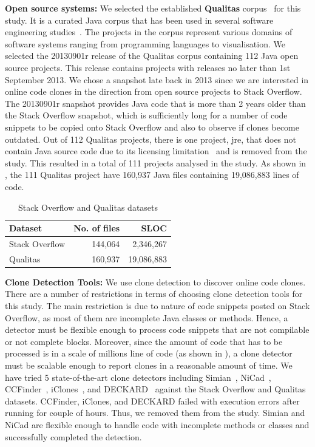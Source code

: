 \documentclass[sigconf,review, anonymous]{acmart}
\begin{document}
\textbf{Open source systems: }
We selected the established \textbf{Qualitas} corpus~\cite{QualitasCorpus} 
for this study. It is a curated Java corpus that has been used in several
software engineering
studies~\cite{Taube-Schock2011,Beckman2011,Vasilescu2011,Omar2012}. The
projects in the corpus represent various domains of software systems
ranging from programming languages to
visualisation. We selected the 20130901r release
of the Qualitas corpus containing 112 Java open source projects. This
release contains projects with releases no later than 1st September
2013. We chose a snapshot late back in 2013 since we are interested in
online code clones in the direction from open source projects to Stack
Overflow. The 20130901r snapshot provides Java code that is more than
2 years older than the Stack Overflow snapshot, which is sufficiently
long for a number of code snippets to be copied onto Stack Overflow
and also to observe if clones become outdated. Out of 112 Qualitas
projects, there is one project, \textsf{jre}, that does not contain
Java source code due to its licensing limitation~\cite{QualitasCorpus}
and is removed from the study. This resulted in a total of 111
projects analysed in the study. As shown in , the
111 Qualitas project have 160,937 Java files containing 19,086,883
lines of
code. %

\begin{table}
  \centering
  \caption{Stack Overflow and Qualitas datasets}
  \label{tab:datasets}
  \begin{tabular}{lrr}
    \hline 
    Dataset & No. of files & SLOC \\
    \hline
    Stack Overflow & 144,064 & 2,346,267 \\ 
    Qualitas &  160,937 & 19,086,883 \\ 
    \hline 
  \end{tabular} 
\end{table}

\textbf{Clone Detection Tools: }
We use clone detection to discover online code clones. 
There are a number of restrictions in terms of choosing clone
detection tools for this study. The main restriction is due to nature
of code snippets posted on Stack Overflow, as most of them are
incomplete Java classes or methods. Hence, a detector must be flexible
enough to process code snippets that are not compilable or not
complete blocks. Moreover, since the amount of code that has to be
processed is in a scale of millions line of code (as shown in
), a clone detector must be scalable enough to
report clones in a reasonable amount of time. We have tried 5
state-of-the-art clone detectors including Simian~\cite{simian},
NiCad~\cite{Cordy,Roy2008}, CCFinder~\cite{Kamiya2002},
iClones~\cite{Gode2009}, and DECKARD~\cite{Jiang2007a} against the
Stack Overflow and Qualitas datasets. CCFinder, iClones, and DECKARD
failed with execution errors after running for couple of hours. Thus,
we removed them from the study. Simian and NiCad are flexible enough
to handle code with incomplete methods or classes and successfully
completed the detection.
\end{document}
